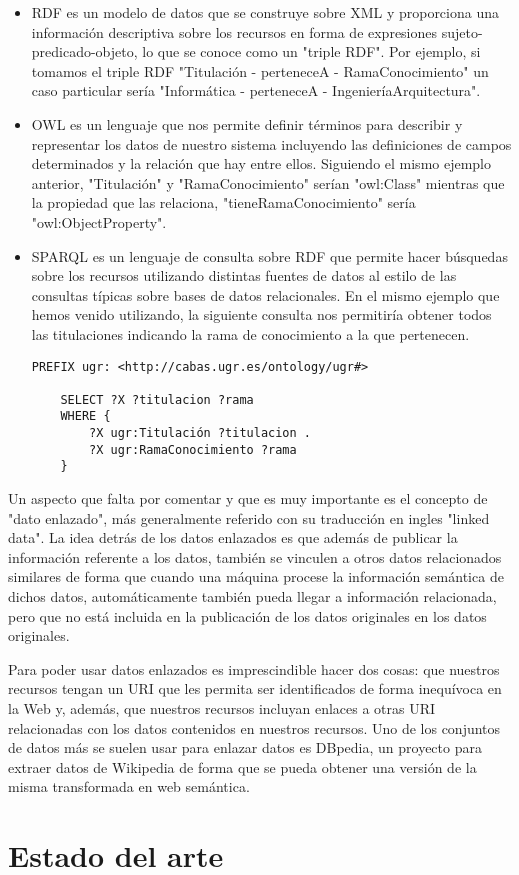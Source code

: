 \begin{itemize}
	\item RDF es un modelo de datos que se construye sobre XML y proporciona una información descriptiva sobre los recursos en forma de expresiones sujeto-predicado-objeto, lo que se conoce como un "triple RDF". 
	\newline Por ejemplo, si tomamos el triple RDF "Titulación - perteneceA - RamaConocimiento" un caso particular sería "Informática - perteneceA - IngenieríaArquitectura".
	\item OWL es un lenguaje que nos permite definir términos para describir y representar los datos de nuestro sistema incluyendo las definiciones de campos determinados y la relación que hay entre ellos. 
	\newline Siguiendo el mismo ejemplo anterior, "Titulación" y "RamaConocimiento" serían "owl:Class" mientras que la propiedad que las relaciona, "tieneRamaConocimiento" sería "owl:ObjectProperty".
	\item SPARQL es un lenguaje de consulta sobre RDF que permite hacer búsquedas sobre los recursos utilizando distintas fuentes de datos al estilo de las consultas típicas sobre bases de datos relacionales. 
	\newline En el mismo ejemplo que hemos venido utilizando, la siguiente consulta nos permitiría obtener todos las titulaciones indicando la rama de conocimiento a la que pertenecen.
	\begin{lstlisting}[language=sparql,caption={Consulta SPARQL de ejemplo},label={lst:consulta_sparql_ejemplo}]
    PREFIX ugr: <http://cabas.ugr.es/ontology/ugr#>
	 
    SELECT ?X ?titulacion ?rama
    WHERE {
        ?X ugr:Titulación ?titulacion .
        ?X ugr:RamaConocimiento ?rama
    }
	 \end{lstlisting}
\end{itemize}

Un aspecto que falta por comentar y que es muy importante es el concepto de "dato enlazado", más generalmente referido con su traducción en ingles "linked data". La idea detrás de los datos enlazados es que además de publicar la información referente a los datos, también se vinculen a otros datos relacionados similares de forma que cuando una máquina procese la información semántica de dichos datos, automáticamente también pueda llegar a información relacionada, pero que no está incluida en la publicación de los datos originales en los datos originales.

\bigskip
Para poder usar datos enlazados es imprescindible hacer dos cosas: que nuestros recursos tengan un URI que les permita ser identificados de forma inequívoca en la Web y, además, que nuestros recursos incluyan enlaces a otras URI relacionadas con los datos contenidos en nuestros recursos. Uno de los conjuntos de datos más se suelen usar para enlazar datos es DBpedia, un proyecto para extraer datos de Wikipedia de forma que se pueda obtener una versión de la misma transformada en web semántica.

\section{Estado del arte}